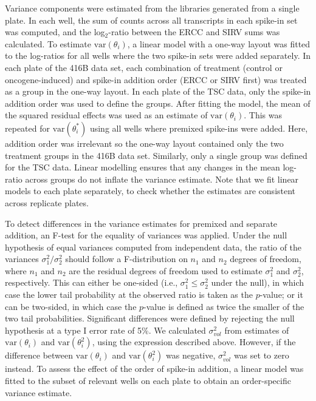\documentclass{article}
\newcommand\variance{\mbox{var}}
\begin{document}
Variance components were estimated from the libraries generated from a single plate.
In each well, the sum of counts across all transcripts in each spike-in set was computed, and the log$_2$-ratio between the ERCC and SIRV sums was calculated.
To estimate $\variance(\theta_i)$, a linear model with a one-way layout was fitted to the log-ratios for all wells where the two spike-in sets were added separately.
In each plate of the 416B data set, each combination of treatment (control or oncogene-induced) and spike-in addition order (ERCC or SIRV first) was treated as a group in the one-way layout.
In each plate of the TSC data, only the spike-in addition order was used to define the groups.
After fitting the model, the mean of the squared residual effects was used as an estimate of $\variance(\theta_i)$.
This was repeated for $\variance(\theta^*_i)$ using all wells where premixed spike-ins were added.
Here, addition order was irrelevant so the one-way layout contained only the two treatment groups in the 416B data set.
Similarly, only a single group was defined for the TSC data.
Linear modelling ensures that any changes in the mean log-ratio across groups do not inflate the variance estimate.
Note that we fit linear models to each plate separately, to check whether the estimates are consistent across replicate plates.

To detect differences in the variance estimates for premixed and separate addition, an F-test for the equality of variances was applied.
Under the null hypothesis of equal variances computed from independent data, the ratio of the variances $\sigma^2_1/\sigma^2_2$ should follow a F-distribution on $n_1$ and $n_2$ degrees of freedom, where $n_1$ and $n_2$ are the residual degrees of freedom used to estimate $\sigma^2_1$ and $\sigma^2_2$, respectively.
This can either be one-sided (i.e., $\sigma^2_1 \le \sigma^2_2$ under the null), in which case the lower tail probability at the observed ratio is taken as the $p$-value;
or it can be two-sided, in which case the $p$-value is defined as twice the smaller of the two tail probabilities.
Significant differences were defined by rejecting the null hypothesis at a type I error rate of 5\%.
We calculated $\sigma^2_{vol}$ from estimates of $\variance(\theta_i)$ and $\variance(\theta^2_i)$, using the expression described above.
However, if the difference between $\variance(\theta_i)$ and $\variance(\theta^2_i)$ was negative, $\sigma^2_{vol}$ was set to zero instead.
To assess the effect of the order of spike-in addition, a linear model was fitted to the subset of relevant wells on each plate to obtain an order-specific variance estimate.
\end{document}
